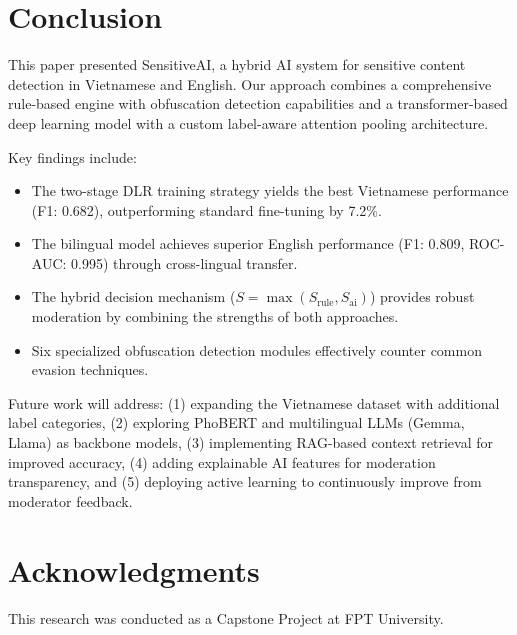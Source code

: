 \documentclass[12pt,a4paper]{article}
\begin{document}
\section{Conclusion}
\label{sec:conclusion}

This paper presented SensitiveAI, a hybrid AI system for sensitive content detection in Vietnamese and English.
Our approach combines a comprehensive rule-based engine with obfuscation detection capabilities and a transformer-based deep learning model with a custom label-aware attention pooling architecture.

Key findings include:
\begin{itemize}[leftmargin=*]
    \item The two-stage DLR training strategy yields the best Vietnamese performance (F1: 0.682), outperforming standard fine-tuning by 7.2\%.
    \item The bilingual model achieves superior English performance (F1: 0.809, ROC-AUC: 0.995) through cross-lingual transfer.
    \item The hybrid decision mechanism ($S = \max(S_{\text{rule}}, S_{\text{ai}})$) provides robust moderation by combining the strengths of both approaches.
    \item Six specialized obfuscation detection modules effectively counter common evasion techniques.
\end{itemize}

Future work will address: (1) expanding the Vietnamese dataset with additional label categories, (2) exploring PhoBERT and multilingual LLMs (Gemma, Llama) as backbone models, (3) implementing RAG-based context retrieval for improved accuracy, (4) adding explainable AI features for moderation transparency, and (5) deploying active learning to continuously improve from moderator feedback.

\section*{Acknowledgments}

This research was conducted as a Capstone Project at FPT University.
\end{document}
